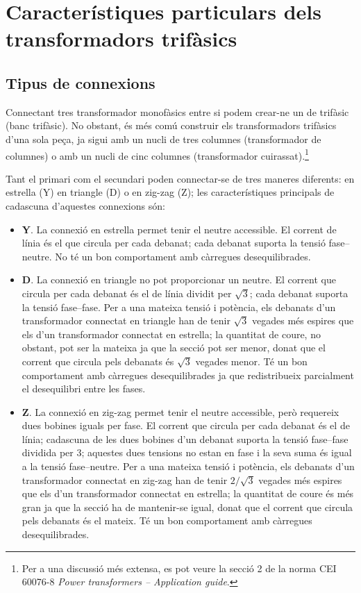\section{Característiques particulars  dels transformadors trifàsics}\label{sec:caract-trans-trif}

\subsection{Tipus de connexions}


Connectant tres transformador monofàsics entre si podem crear-ne un de trifàsic (banc trifàsic). No obstant, és més comú construir els transformadors trifàsics d'una sola peça, ja sigui amb un nucli de tres columnes (transformador de columnes) o amb un nucli de cinc columnes (transformador cuirassat).\footnote{Per a una discussió més extensa, es pot veure la secció 2 de la norma CEI 60076-8 \emph{Power transformers -- Application guide}.}

Tant el primari com el secundari poden connectar-se de tres maneres diferents: en estrella (Y) en triangle (D) o en zig-zag (Z); les característiques principals de cadascuna d'aquestes connexions són:

\begin{itemize}
   \item \textbf{Y}. La connexió en estrella permet tenir el neutre accessible. El corrent de línia és el que circula per cada debanat; cada debanat suporta la tensió fase--neutre. No té un bon comportament amb càrregues desequilibrades.
   \item \textbf{D}. La connexió en triangle no pot proporcionar un neutre. El corrent que circula per cada debanat és el de línia dividit per $\sqrt{3}$; cada debanat suporta la tensió fase--fase. Per a una mateixa tensió i potència, els debanats d'un transformador connectat en triangle han de tenir $\sqrt{3}$ vegades més espires que els d'un transformador connectat en estrella; la quantitat de coure, no obstant, pot ser la mateixa ja que la secció pot ser menor, donat que el corrent que circula pels debanats és $\sqrt{3}$ vegades menor. Té un bon comportament amb càrregues desequilibrades ja que redistribueix parcialment el desequilibri entre les fases.
   \item \textbf{Z}. La connexió en zig-zag permet tenir el neutre accessible, però requereix dues bobines iguals per fase. El corrent que circula per cada debanat és el de línia; cadascuna de les dues bobines d'un debanat suporta la tensió fase--fase dividida per 3; aquestes dues tensions no estan en fase i la seva suma és igual a la tensió fase--neutre. Per a una mateixa tensió i potència, els debanats d'un transformador connectat en zig-zag han de tenir $2/\sqrt{3}$ vegades més espires que els d'un transformador connectat en estrella; la quantitat de coure és més gran ja que la secció ha de mantenir-se igual, donat que el corrent que circula pels debanats és el mateix. Té un bon comportament amb càrregues desequilibrades.
\end{itemize}

